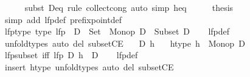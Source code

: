 \begin{isabellebody}
\ \ \ \ \isamarkupfalse%
\ {\isacharparenleft}{\kern0pt}subst\ D{\isacharunderscore}{\kern0pt}eq{\isacharcomma}{\kern0pt}\ rule\ collect{\isacharunderscore}{\kern0pt}cong{\isacharparenright}{\kern0pt}\ {\isacharparenleft}{\kern0pt}auto\ simp{\isacharcolon}{\kern0pt}\ h{\isacharunderscore}{\kern0pt}eq{\isacharparenright}{\kern0pt}\isanewline
\ \ \isamarkupfalse%
\ \isamarkupfalse%
\ {\isacharquery}{\kern0pt}thesis\ \isamarkupfalse%
\ {\isacharparenleft}{\kern0pt}simp\ add{\isacharcolon}{\kern0pt}\ lfp{\isacharunderscore}{\kern0pt}def\ prefixpoint{\isacharunderscore}{\kern0pt}def{\isacharparenright}{\kern0pt}\isanewline
{}\isamarkupfalse%
%
\endisatagproof
{\isafoldproof}%
%
\isadelimproof
\isanewline
%
\endisadelimproof
\isanewline
{}\isamarkupfalse%
\ lfp{\isacharunderscore}{\kern0pt}type\ {\isacharbrackleft}{\kern0pt}type{\isacharbrackright}{\kern0pt}{\isacharcolon}{\kern0pt}\ {\isachardoublequoteopen}lfp\ {\isacharcolon}{\kern0pt}\ {\isacharparenleft}{\kern0pt}D\ {\isacharcolon}{\kern0pt}\ Set{\isacharparenright}{\kern0pt}\ {\isasymRightarrow}\ Monop\ D\ {\isasymRightarrow}\ Subset\ D{\isachardoublequoteclose}\isanewline
%
\isadelimproof
\ \ %
\endisadelimproof
%
\isatagproof
{}\isamarkupfalse%
\ lfp{\isacharunderscore}{\kern0pt}def\ \isamarkupfalse%
\ unfold{\isacharunderscore}{\kern0pt}types\ {\isacharparenleft}{\kern0pt}auto\ del{\isacharcolon}{\kern0pt}\ subsetCE{\isacharparenright}{\kern0pt}%
\endisatagproof
{\isafoldproof}%
%
\isadelimproof
\isanewline
%
\endisadelimproof
\isanewline
\isanewline
{}\isamarkupfalse%
\isanewline
\ \ \ D\ h\isanewline
\ \ \ h{\isacharunderscore}{\kern0pt}type{\isacharcolon}{\kern0pt}\ {\isachardoublequoteopen}h\ {\isacharcolon}{\kern0pt}\ Monop\ D{\isachardoublequoteclose}\isanewline
{}\isanewline
\isanewline
{}\isamarkupfalse%
\ lfp{\isacharunderscore}{\kern0pt}subset\ {\isacharbrackleft}{\kern0pt}iff{\isacharbrackright}{\kern0pt}{\isacharcolon}{\kern0pt}\ {\isachardoublequoteopen}lfp\ D\ h\ {\isasymsubseteq}\ D{\isachardoublequoteclose}\isanewline
%
\isadelimproof
\ \ %
\endisadelimproof
%
\isatagproof
{}\isamarkupfalse%
\ lfp{\isacharunderscore}{\kern0pt}def\ \isamarkupfalse%
\ {\isacharparenleft}{\kern0pt}insert\ h{\isacharunderscore}{\kern0pt}type{\isacharcomma}{\kern0pt}\ unfold{\isacharunderscore}{\kern0pt}types{\isacharparenright}{\kern0pt}\ {\isacharparenleft}{\kern0pt}auto\ del{\isacharcolon}{\kern0pt}\ subsetCE{\isacharparenright}{\kern0pt}%

\end{isabellebody}
